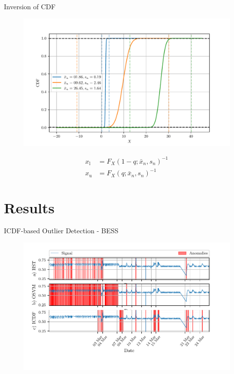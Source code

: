 \documentclass[aspectratio=169]{beamer}
\newcommand{\ui}[2]{#1 _{\mathrm{#2}}}
\begin{document}
\begin{frame}{Inversion of CDF}
    \begin{figure}
        \begin{center}
            \includegraphics[width=0.62\linewidth]{../ilustrate/pc2023/cdf_ppf.pdf}
        \end{center}
    \end{figure}
    \begin{align*}
        \ui{x}{l} & = F_{X}(1 - q; \bar x_n, s_n)^{-1} \\
        \ui{x}{u} & = F_{X}(q; \bar x_n, s_n)^{-1}
    \end{align*}
\end{frame}

\section{Results}

\begin{frame}{ICDF-based Outlier Detection - BESS}
    \begin{figure}[htpb]
        \begin{center}
            \includegraphics[width=0.78\linewidth]{figures/Average_Cell_Temperature_sliding_compare_anomalies.pdf}
        \end{center}
    \end{figure}
\end{frame}
\end{document}

